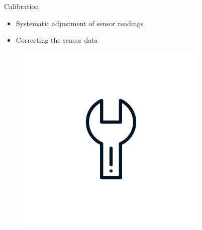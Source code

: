 \documentclass[aspectratio=169]{beamer}
[aspectratio=169] %
\begin{document}
\begin{frame}{Calibration}
  \begin{minipage}{0.49\textwidth} 
    \begin{itemize}
      \item Systematic adjustment of sensor readings
      \item Correcting the sensor data
    \end{itemize}
  \end{minipage}
  \hfill
  \begin{minipage}{0.49\textwidth} 
    \begin{figure}
      \centering
      \includegraphics[height=0.5\textheight]{figures/tool.png}
    \end{figure}
  \end{minipage}
\end{frame}

\end{document}
